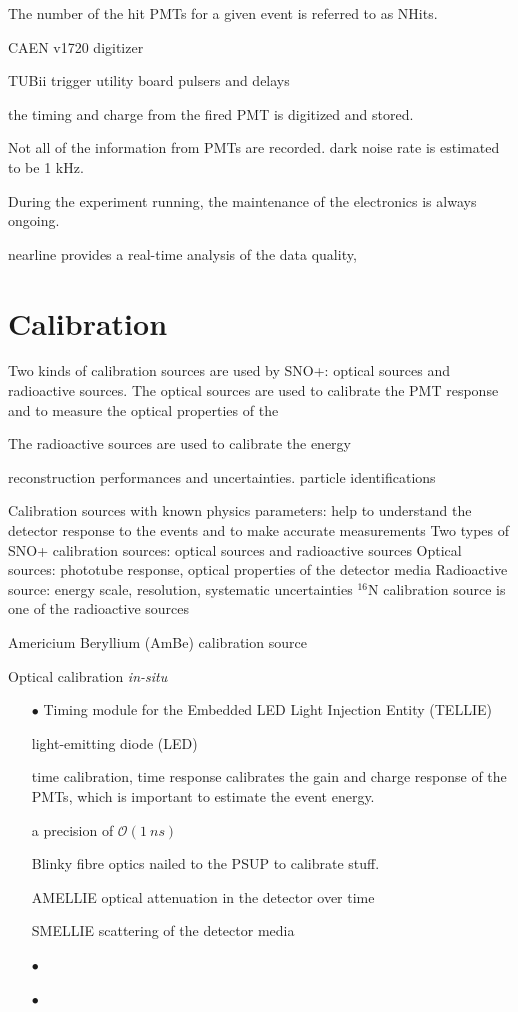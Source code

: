 The number of the hit PMTs for a given event is referred to as NHits.


CAEN v1720 digitizer 

TUBii trigger utility board 
pulsers and delays

the timing and charge from the fired PMT is digitized and stored.

Not all of the information from PMTs are recorded. 
dark noise rate is estimated to be 1 kHz.


During the experiment running, the maintenance of the electronics is always ongoing.

nearline provides a real-time analysis of the data quality, 



\cite{andyElectronics}

\section{Calibration}
Two kinds of calibration sources are used by SNO+: optical sources and radioactive sources. 
The optical sources are used to calibrate the PMT response and to measure the optical properties of the 

The radioactive sources are used to calibrate the energy 

reconstruction performances and uncertainties.
particle identifications

Calibration sources with known physics parameters: help to understand the detector response to the events and to make accurate measurements
Two types of SNO+ calibration sources: optical sources and radioactive sources Optical sources: phototube response, optical properties of the detector media Radioactive source: energy scale, resolution, systematic
uncertainties
$^{16}$N calibration source is one of the radioactive sources


Americium Beryllium (AmBe) calibration source

Optical calibration  {\emph {in-situ}} 
\begin{itemize}  
	\item[$\bullet$] Timing module for the Embedded LED Light Injection Entity (TELLIE)
	
	light-emitting diode (LED)
	
	
	time calibration, time response
	calibrates the gain and charge response of the PMTs, which is important to estimate the event energy.
	
	a precision of $\mathcal{O} (1~ns)$
	
	Blinky fibre optics nailed to the PSUP to calibrate stuff.
	
	AMELLIE
	optical attenuation in the detector over time
	
	SMELLIE scattering of the detector media
	
	\item[$\bullet$]  
	
	
	\item[$\bullet$] 
\end{itemize}

